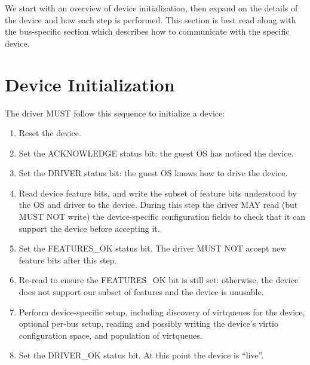 We start with an overview of device initialization, then expand on the
details of the device and how each step is performed.  This section
is best read along with the bus-specific section which describes
how to communicate with the specific device.

\section{Device Initialization}\label{sec:General Initialization And Device Operation / Device Initialization}

The driver MUST follow this sequence to initialize a device:

\begin{enumerate}
\item Reset the device.

\item Set the ACKNOWLEDGE status bit: the guest OS has noticed the device.

\item Set the DRIVER status bit: the guest OS knows how to drive the device.

\item\label{itm:General Initialization And Device Operation /
Device Initialization / Read feature bits} Read device feature bits, and write the subset of feature bits
   understood by the OS and driver to the device.  During this step the
   driver MAY read (but MUST NOT write) the device-specific configuration fields to check that it can support the device before accepting it.

\item\label{itm:General Initialization And Device Operation / Device Initialization / Set FEATURES-OK} Set the FEATURES_OK status bit.  The driver MUST NOT accept
   new feature bits after this step.

\item\label{itm:General Initialization And Device Operation / Device Initialization / Re-read FEATURES-OK} Re-read  to ensure the FEATURES_OK bit is still
   set: otherwise, the device does not support our subset of features
   and the device is unusable.

\item\label{itm:General Initialization And Device Operation / Device Initialization / Device-specific Setup} Perform device-specific setup, including discovery of virtqueues for the
   device, optional per-bus setup, reading and possibly writing the
   device's virtio configuration space, and population of virtqueues.

\item\label{itm:General Initialization And Device Operation / Device Initialization / Set DRIVER-OK} Set the DRIVER_OK status bit.  At this point the device is
   ``live''.
\end{enumerate}

